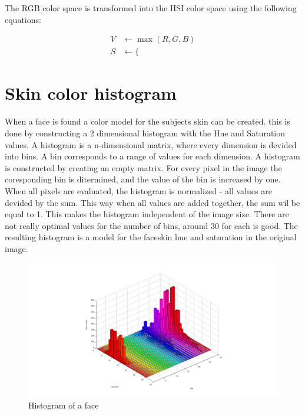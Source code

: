 The RGB color space is transformed into the HSI color space using the following equations:

\begin{eqnarray*}
	V&\leftarrow \max(R,G,B) \label{first} \\
	S&\leftarrow \{
\end{eqnarray*}



\section{Skin color histogram}
When a face is found a color model for the subjects skin can be created. this is done by constructing a 2 dimensional histogram with the Hue and Saturation values. A histogram is a n-dimensional matrix, where every dimension is devided into bins. A bin corresponds to a range of values for each dimension. A histogram is constructed by creating an empty matrix. For every pixel in the image the coresponding bin is ditermined, and the value of the bin is increased by one. When all pixels are evaluated, the histogram is normalized - all values are devided by the sum. This way when all values are added together, the sum wil be equal to 1. This makes the histogram independent of the image size. There are not really optimal values for the number of bins, around 30 for each is good. The resulting histogram is a model for the faceskin hue and saturation in the original image.

\begin{figure}[htbp]
	\center
	\includegraphics[width=0.8\linewidth]{figures/face_hist.png}
	\caption{Histogram of a face}
	\label{fig:face_hsv}
\end{figure}

